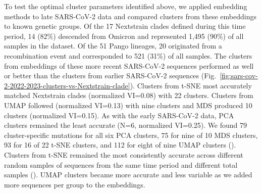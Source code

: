 \documentclass[10pt,letterpaper]{article}
\begin{document}
To test the optimal cluster parameters identified above, we applied embedding methods to late SARS-CoV-2 data and compared clusters from these embeddings to known genetic groups.
Of the 17 Nextstrain clades defined during this time period, 14 (82\%) descended from Omicron and represented 1,495 (90\%) of all samples in the dataset.
Of the 51 Pango lineages, 20 originated from a recombination event and corresponded to 521 (31\%) of all samples.
The clusters from embeddings of these more recent SARS-CoV-2 sequences performed as well or better than the clusters from earlier SARS-CoV-2 sequences (Fig.~\ref{fig:sars-cov-2-2022-2023-clusters-vs-Nextstrain-clade}).
Clusters from t-SNE most accurately matched Nextstrain clades (normalized VI=0.08) with 22 clusters.
Clusters from UMAP followed (normalized VI=0.13) with nine clusters and MDS produced 10 clusters (normalized VI=0.15).
As with the early SARS-CoV-2 data, PCA clusters remained the least accurate (N=6, normalized VI=0.25).
We found 79 cluster-specific mutations for all six PCA clusters, 75 for nine of 10 MDS clusters, 93 for 16 of 22 t-SNE clusters, and 112 for eight of nine UMAP clusters ().
Clusters from t-SNE remained the most consistently accurate across different random samples of sequences from the same time period and different total samples ().
UMAP clusters became more accurate and less variable as we added more sequences per group to the embeddings.
\end{document}
